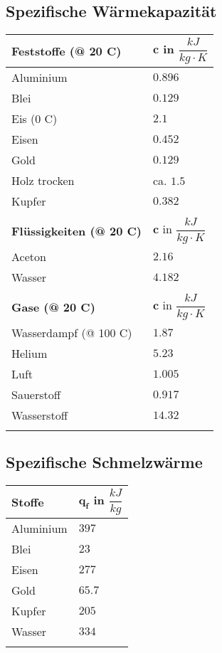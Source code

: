 	\subsection{Spezifische Wärmekapazität}
		\begin{tabular}{| p{6cm} | p{5cm} |}
			\hline
			\textbf{Feststoffe (@ 20 \textdegree C)}	&	$\boldsymbol{c}$ in $\dfrac{kJ}{kg \cdot K}$\\
			\hline
			Aluminium & $0.896$\\
			Blei & $0.129$\\
			Eis (0 \textdegree C) & $2.1$\\
			Eisen & $0.452$\\
			Gold & $0.129$\\
			Holz trocken & ca. $1.5$\\
			Kupfer & $0.382$\\
			& \\
			\hline
			\textbf{Flüssigkeiten (@ 20 \textdegree C)} & $\boldsymbol{c}$ in $\dfrac{kJ}{kg \cdot K}$\\
			\hline
			Aceton & $2.16$\\
			Wasser & $4.182$\\
			& \\
			\hline
			\textbf{Gase (@ 20 \textdegree C)}	&	$\boldsymbol{c}$ in $\dfrac{kJ}{kg \cdot K}$\\
			\hline
			Wasserdampf (@ 100 \textdegree C) & $1.87$\\
			Helium & $5.23$\\
			Luft & $1.005$\\
			Sauerstoff & $0.917$\\
			Wasserstoff & $14.32$\\
			& \\
			\hline
		\end{tabular}
	
	\subsection{Spezifische Schmelzwärme}
		\begin{tabular}{| p{6cm} | p{5cm} |}
			\hline
			\textbf{Stoffe}	&	$\boldsymbol{q_f}$ in $\dfrac{kJ}{kg}$\\
			\hline
			Aluminium & $397$\\
			Blei & $23$\\
			Eisen & $277$\\
			Gold & $65.7$\\
			Kupfer & $205$\\
			Wasser & $334$\\
			& \\
			\hline
		\end{tabular}
	
